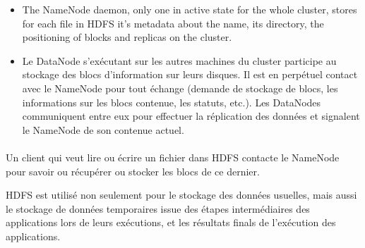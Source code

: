 \documentclass[12pt,english]{book}
\begin{document}
\begin{itemize}
\item
The NameNode daemon, only one in active state for the whole cluster, stores for each file in HDFS it's metadata about the name, its directory, the positioning of blocks and replicas on the cluster.


\item
	Le DataNode s’exécutant sur les autres machines du cluster participe au stockage des blocs d’information sur leurs disques.  Il est en perpétuel contact avec le NameNode pour tout échange (demande de stockage de blocs, les informations sur les blocs contenue, les statuts, etc.).   Les DataNodes communiquent entre eux pour effectuer la réplication des données et signalent le NameNode de son contenue actuel.
\end{itemize}
\paragraph{}

Un client qui veut lire ou écrire un fichier dans HDFS contacte le NameNode pour savoir ou récupérer ou stocker les blocs de ce dernier.

HDFS est utilisé non seulement pour le stockage des données usuelles, mais aussi le stockage de données temporaires issue des étapes intermédiaires des applications lors de leurs exécutions, et les résultats finals de l’exécution des applications.     
\end{document}
